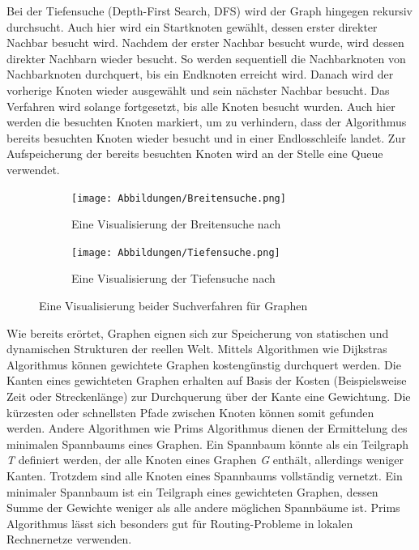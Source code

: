 Bei der Tiefensuche (Depth-First Search, DFS) wird der Graph hingegen rekursiv durchsucht. Auch hier wird ein Startknoten gewählt, dessen erster direkter Nachbar besucht wird. Nachdem der erster Nachbar besucht wurde, wird dessen direkter Nachbarn wieder besucht. So werden sequentiell die Nachbarknoten von Nachbarknoten durchquert, bis ein Endknoten erreicht wird. Danach wird der vorherige Knoten wieder ausgewählt und sein nächster Nachbar besucht. Das Verfahren wird solange fortgesetzt, bis alle Knoten besucht wurden. Auch hier werden die besuchten Knoten markiert, um zu verhindern, dass der Algorithmus bereits besuchten Knoten wieder besucht und in einer Endlosschleife landet. Zur Aufspeicherung der bereits besuchten Knoten wird an der Stelle eine Queue verwendet. \autocite[231-232]{knebl_algorithmen_2021} \autocite[666]{ernst_grundkurs_2020}

\begin{figure}[t]
	\centering
	\begin{subfigure}[h]{0.49\textwidth}
		\texttt{[image: Abbildungen/Breitensuche.png]}
		\centering
		\caption{Eine Visualisierung der Breitensuche nach \textcite[228]{knebl_algorithmen_2021}}
		\label{fig: breitensuche}
	\end{subfigure}
	\hfill
	\begin{subfigure}[h]{0.49\textwidth}
		\texttt{[image: Abbildungen/Tiefensuche.png]}
		\centering
		\caption{Eine Visualisierung der Tiefensuche nach \textcite[232]{knebl_algorithmen_2021}}
		\label{fig: tiefensuche}
	\end{subfigure}
	\caption{Eine Visualisierung beider Suchverfahren für Graphen}
	\label{fig: graph_search_functions}
\end{figure}

Wie bereits erörtet, Graphen eignen sich zur Speicherung von statischen und dynamischen Strukturen der reellen Welt. Mittels Algorithmen wie Dijkstras Algorithmus können gewichtete Graphen kostengünstig durchquert werden. Die Kanten eines gewichteten Graphen erhalten auf Basis der Kosten (Beispielsweise Zeit oder Streckenlänge) zur Durchquerung über der Kante eine Gewichtung. Die kürzesten oder schnellsten Pfade zwischen Knoten können somit gefunden werden. Andere Algorithmen wie Prims Algorithmus dienen der Ermittelung des minimalen Spannbaums eines Graphen. Ein Spannbaum könnte als ein Teilgraph \textit{T} definiert werden, der alle Knoten eines Graphen \textit{G} enthält, allerdings weniger Kanten. Trotzdem sind alle Knoten eines Spannbaums vollständig vernetzt. Ein minimaler Spannbaum ist ein Teilgraph eines gewichteten Graphen, dessen Summe der Gewichte weniger als alle andere möglichen Spannbäume ist. Prims Algorithmus lässt sich besonders gut für Routing-Probleme in lokalen Rechnernetze verwenden. \autocite[277-282]{hubwieser_fundamente_2015}

